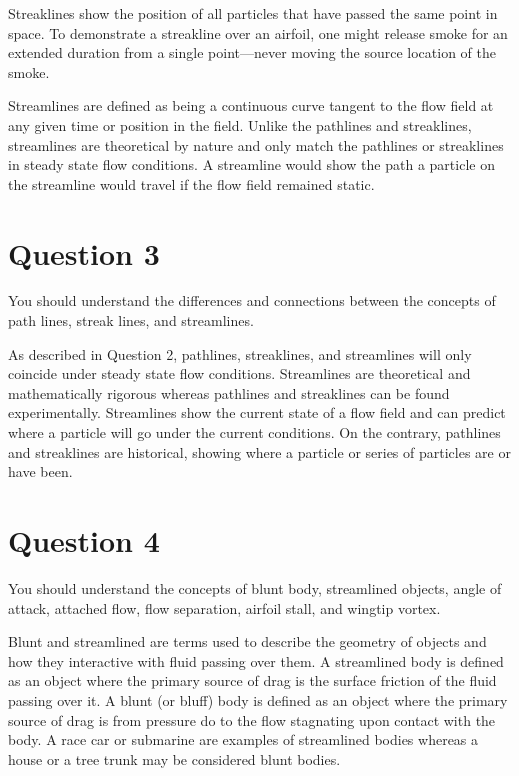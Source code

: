 Streaklines show the position of all particles that have passed the same point in space. To demonstrate a streakline over an airfoil, one might release smoke for an extended duration from a single point—never moving the source location of the smoke.

Streamlines are defined as being a continuous curve tangent to the flow field at any given time or position in the field. Unlike the pathlines and streaklines, streamlines are theoretical by nature and only match the pathlines or streaklines in steady state flow conditions. A streamline would show the path a particle on the streamline would travel if the flow field remained static.

\section{Question 3}
\begin{importantbox}
You should understand the differences and connections between the concepts of path lines, streak lines, and streamlines.
\end{importantbox}

As described in Question 2, pathlines, streaklines, and streamlines will only coincide under steady state flow conditions. Streamlines are theoretical and mathematically rigorous whereas pathlines and streaklines can be found experimentally. Streamlines show the current state of a flow field and can predict where a particle will go under the current conditions. On the contrary, pathlines and streaklines are historical, showing where a particle or series of particles are or have been.

\section{Question 4}
\begin{importantbox}
You should understand the concepts of blunt body, streamlined objects, angle of attack, attached flow, flow separation, airfoil stall, and wingtip vortex.
\end{importantbox}

Blunt and streamlined are terms used to describe the geometry of objects and how they interactive with fluid passing over them. A streamlined body is defined as an object where the primary source of drag is the surface friction of the fluid passing over it. A blunt (or bluff) body is defined as an object where the primary source of drag is from pressure do to the flow stagnating upon contact with the body. A race car or submarine are examples of streamlined bodies whereas a house or a tree trunk may be considered blunt bodies.

